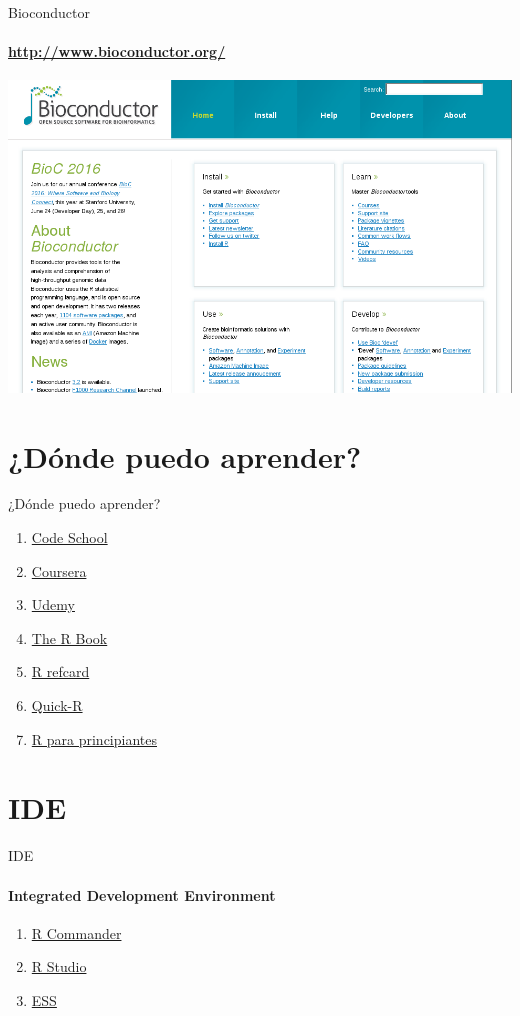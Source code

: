 \documentclass[12pt]{beamer}
\begin{document}
\begin{frame}{Bioconductor}
\framesubtitle{\url{http://www.bioconductor.org/}}
\begin{center}
\href{http://www.bioconductor.org/}{\includegraphics[scale=0.35]{images/image4}}
\end{center}
\end{frame}
\section{¿Dónde puedo aprender?}
\begin{frame}{¿Dónde puedo aprender?}
\begin{enumerate}[<+->]
\item \href{https://www.codeschool.com/courses/try-r}{Code School}
\item \href{https://www.coursera.org/courses?languages=en&query=r}{Coursera}
\item \href{https://www.udemy.com/courses/search/?ref=home&src=ukw&q=R&lang=en}{Udemy}
\item \href{https://archive.org/details/TheRBook}{The R Book}
\item \href{https://cran.r-project.org/doc/contrib/Short-refcard.pdf}{R refcard}
\item \href{http://www.statmethods.net/}{Quick-R}
\item \href{https://cran.r-project.org/doc/contrib/rdebuts_es.pdf}{R para principiantes}
\end{enumerate}    
\end{frame}

\section{IDE}
\begin{frame}{IDE}
\framesubtitle{Integrated Development Environment
}
\begin{enumerate}[<+->]
\item \href{http://www.rcommander.com/}{R Commander}
\item \href{https://www.rstudio.com/}{R Studio}
\item \href{http://ess.r-project.org/}{ESS}
\end{enumerate}
\end{frame}
\end{document}
